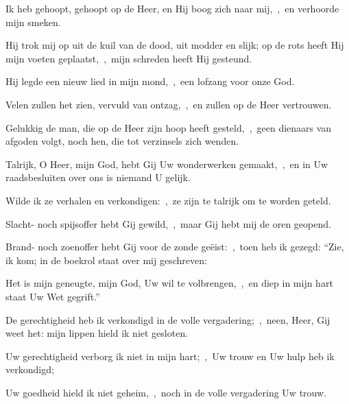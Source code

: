 \documentclass[12pt,twoside,a5paper]{article}
\begin{document}


\begin{halfparskip}
  Ik heb gehoopt, gehoopt op de Heer, en Hij boog zich naar mij,~\sep\ en verhoorde mijn smeken.


  Hij trok mij op uit de kuil van de dood, uit modder en slijk; op de rots heeft Hij mijn voeten geplaatst,~\sep\ mijn schreden heeft Hij gesteund.

  Hij legde een nieuw lied in mijn mond,~\sep\ een lofzang voor onze God.

  Velen zullen het zien, vervuld van ontzag,~\sep\ en zullen op de Heer vertrouwen.

  Gelukkig de man, die op de Heer zijn hoop heeft gesteld,~\sep\ geen dienaars van afgoden volgt, noch hen, die tot verzinsels zich wenden.

  Talrijk, O Heer, mijn God, hebt Gij Uw wonderwerken gemaakt,~\sep\ en in Uw raadsbesluiten over ons is niemand U gelijk.

  Wilde ik ze verhalen en verkondigen:~\sep\ ze zijn te talrijk om te worden geteld.
\end{halfparskip}


\begin{halfparskip}
  Slacht- noch spijsoffer hebt Gij gewild,~\sep\ maar Gij hebt mij de oren geopend.

  Brand- noch zoenoffer hebt Gij voor de zonde geëist:~\sep\ toen heb ik gezegd: ``Zie, ik kom; in de boekrol staat over mij geschreven:

  Het is mijn geneugte, mijn God, Uw wil te volbrengen,~\sep\ en diep in mijn hart staat Uw Wet gegrift.''

  De gerechtigheid heb ik verkondigd in de volle vergadering;~\sep\ neen, Heer, Gij weet het: mijn lippen hield ik niet gesloten.

  Uw gerechtigheid verborg ik niet in mijn hart;~\sep\ Uw trouw en Uw hulp heb ik verkondigd;

  Uw goedheid hield ik niet geheim,~\sep\ noch in de volle vergadering Uw trouw.
\end{halfparskip}

\end{document}
